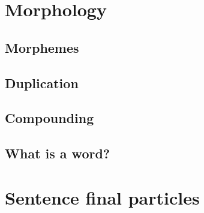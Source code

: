 \documentclass[UTF8, a4paper, oneside, scheme=plain]{ctexart}
\begin{document}
\section{Morphology}

\subsection{Morphemes}

\subsection{Duplication}

\subsection{Compounding}

\subsection{What is a word?}

\section{Sentence final particles}



\end{document}
